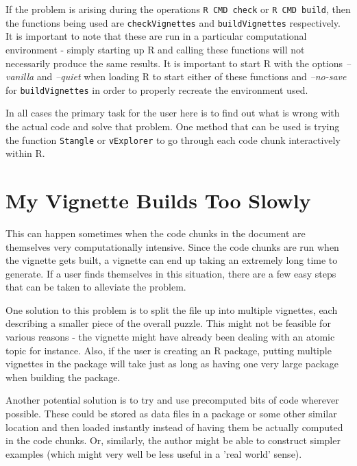 \documentclass{article}
\newcommand{\Rfunction}[1]{{\texttt{#1}}}
\newcommand{\Rfunarg}[1]{{\textit{#1}}}
\begin{document}
If the problem is arising during the operations \Rfunction{R CMD
check} or \Rfunction{R CMD build}, then the functions being used are
\Rfunction{checkVignettes} and \Rfunction{buildVignettes}
respectively.  It is important to note that these are run in a
particular computational environment - simply starting up R and
calling these functions will not necessarily produce the same
results.  It is important to start R with the options
\Rfunarg{--vanilla} and \Rfunarg{--quiet} when loading R to start
either of these functions and \Rfunarg{--no-save} for
\Rfunction{buildVignettes} in order to properly recreate the
environment used.  

In all cases the primary task for the user here is to find out what is
wrong with the actual code and solve that problem.  One method that
can be used is trying the function \Rfunction{Stangle} or
\Rfunction{vExplorer} to go through each code chunk interactively
within R.

\section*{My Vignette Builds Too Slowly}

This can happen sometimes when the code chunks in the document are
themselves very computationally intensive.  Since the code chunks are
run when the vignette gets built, a vignette can end up taking an
extremely long time to generate.  If a user finds themselves in this
situation, there are a few easy steps that can be taken to alleviate
the problem.

One solution to this problem is to split the file up into multiple
vignettes, each describing a smaller piece of the overall puzzle.
This might not be feasible for various reasons - the vignette might
have already been dealing with an atomic topic for instance.  Also, if
the user is creating an R package, putting multiple vignettes in the
package will take just as long as having one very large package when
building the package.

Another potential solution is to try and use precomputed bits of code
wherever possible.  These could be stored as data files in a package
or some other similar location and then loaded instantly instead of
having them be actually computed in the code chunks.  Or, similarly,
the author might be able to construct simpler examples (which might
very well be less useful in a 'real world' sense).


\end{document}
